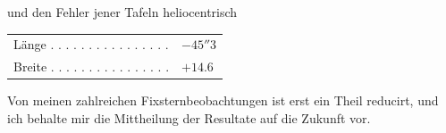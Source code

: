 \noindent und den Fehler jener Tafeln heliocentrisch

\begin{center}
\begin{tabular}{ll}
Länge . . . . . . . . . . . . . . . . & $-45''3$ \\
Breite . . . . . . . . . . . . . . . . & $+14.6$ \\
\end{tabular}
\end{center}

\par\indent Von meinen zahlreichen Fixsternbeobachtungen ist erst ein Theil reducirt, und ich behalte mir die Mittheilung der Resultate auf die Zukunft vor.
